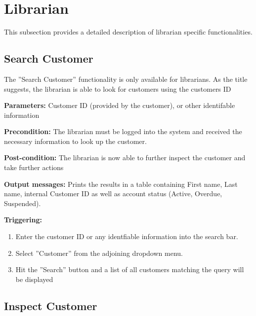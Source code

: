 \section{Librarian}
\label{operation:Librarian}

This subsection provides a detailed description of librarian specific
functionalities.

\subsection{Search Customer}

The ''Search Customer'' functionality is only available for librarians. As the
title suggests, the librarian is able to look for customers using the
customers ID

\begin{description}

\item \textbf{Parameters:} Customer ID (provided by the customer), or other
identifable information

\item \textbf{Precondition:} The librarian must be logged into the system and
received the necessary information to look up the customer.

\item \textbf{Post-condition:} The librarian is now able to further inspect the
customer and take further actions

\item \textbf{Output messages:} Prints the results in a table containing First
name, Last name, internal Customer ID as well as account status (Active,
Overdue, Suspended).

\item \textbf{Triggering:}
\begin{enumerate}
\item Enter the customer ID or any identfiable information into the search bar.
\item Select ''Customer'' from the adjoining dropdown menu.
\item Hit the ''Search'' button and a list of all customers matching the query
will be displayed
\end{enumerate}

\end{description}

\subsection{Inspect Customer}

